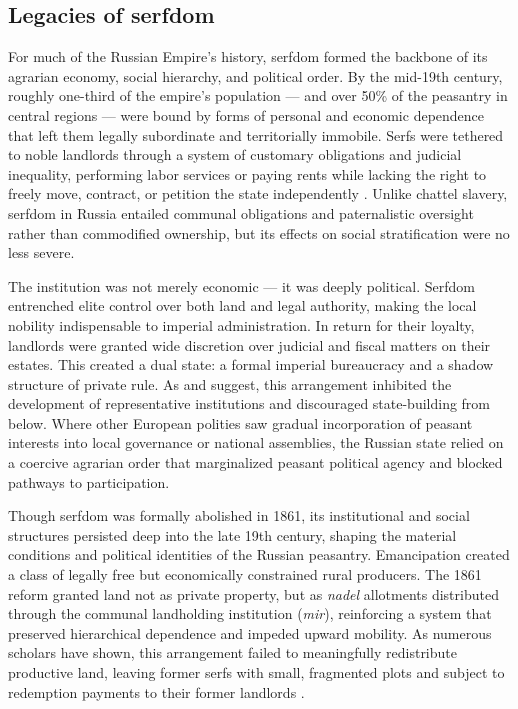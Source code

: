 \documentclass[11pt]{scrarticle}
\begin{document}
\subsection{Legacies of serfdom}

For much of the Russian Empire’s history, serfdom formed the backbone of its agrarian economy, social hierarchy, and political order. By the mid-19th century, roughly one-third of the empire’s population — and over 50\% of the peasantry in central regions — were bound by forms of personal and economic dependence that left them legally subordinate and territorially immobile. Serfs were tethered to noble landlords through a system of customary obligations and judicial inequality, performing labor services or paying rents while lacking the right to freely move, contract, or petition the state independently \parencite{dennison_institutional_2011,gerschenkron_economic_1979}. Unlike chattel slavery, serfdom in Russia entailed communal obligations and paternalistic oversight rather than commodified ownership, but its effects on social stratification were no less severe.

The institution was not merely economic — it was deeply political. Serfdom entrenched elite control over both land and legal authority, making the local nobility indispensable to imperial administration. In return for their loyalty, landlords were granted wide discretion over judicial and fiscal matters on their estates. This created a dual state: a formal imperial bureaucracy and a shadow structure of private rule. As \cite{boucoyannis_kings_2021} and \cite{dower_collective_2017} suggest, this arrangement inhibited the development of representative institutions and discouraged state-building from below. Where other European polities saw gradual incorporation of peasant interests into local governance or national assemblies, the Russian state relied on a coercive agrarian order that marginalized peasant political agency and blocked pathways to participation.

Though serfdom was formally abolished in 1861, its institutional and social structures persisted deep into the late 19th century, shaping the material conditions and political identities of the Russian peasantry. Emancipation created a class of legally free but economically constrained rural producers. The 1861 reform granted land not as private property, but as \textit{nadel} allotments distributed through the communal landholding institution (\textit{mir}), reinforcing a system that preserved hierarchical dependence and impeded upward mobility. As numerous scholars have shown, this arrangement failed to meaningfully redistribute productive land, leaving former serfs with small, fragmented plots and subject to redemption payments to their former landlords \parencite{markevich_economic_2018,gerschenkron_economic_1979,buggle_slow_2021}.
\end{document}
